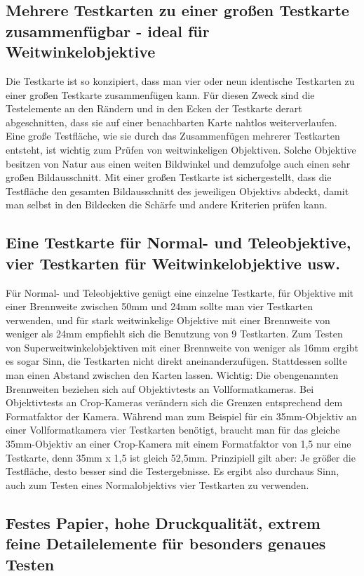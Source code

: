 \subsection{Mehrere Testkarten zu einer großen Testkarte zusammenfügbar - ideal für Weitwinkelobjektive}

Die Testkarte ist so konzipiert, dass man vier oder neun identische Testkarten zu einer großen Testkarte zusammenfügen kann. Für diesen Zweck sind die Testelemente an den Rändern und in den Ecken der Testkarte derart abgeschnitten, dass sie auf einer benachbarten Karte nahtlos weiterverlaufen. Eine große Testfläche, wie sie durch das Zusammenfügen mehrerer Testkarten entsteht, ist wichtig zum Prüfen von weitwinkeligen Objektiven. Solche Objektive besitzen von Natur aus einen weiten Bildwinkel und demzufolge auch einen sehr großen Bildausschnitt. Mit einer großen Testkarte ist sichergestellt, dass die Testfläche den gesamten Bildausschnitt des jeweiligen Objektivs abdeckt, damit man selbst in den Bildecken die Schärfe und andere Kriterien prüfen kann.

\subsection{Eine Testkarte für Normal- und Teleobjektive, vier Testkarten für Weitwinkelobjektive usw.}

Für Normal- und Teleobjektive genügt eine einzelne Testkarte, für Objektive mit einer Brennweite zwischen 50mm und 24mm sollte man vier Testkarten verwenden, und für stark weitwinkelige Objektive mit einer Brennweite von weniger als 24mm empfiehlt sich die Benutzung von 9 Testkarten. Zum Testen von Superweitwinkelobjektiven mit einer Brennweite von weniger als 16mm ergibt es sogar Sinn, die Testkarten nicht direkt aneinanderzufügen. Stattdessen sollte man einen Abstand zwischen den Karten lassen. Wichtig: Die obengenannten Brennweiten beziehen sich auf Objektivtests an Vollformatkameras. Bei Objektivtests an Crop-Kameras verändern sich die Grenzen entsprechend dem Formatfaktor der Kamera. Während man zum Beispiel für ein 35mm-Objektiv an einer Vollformatkamera vier Testkarten benötigt, braucht man für das gleiche 35mm-Objektiv an einer Crop-Kamera mit einem Formatfaktor von 1,5 nur eine Testkarte, denn 35mm x 1,5 ist gleich 52,5mm. Prinzipiell gilt aber: Je größer die Testfläche, desto besser sind die Testergebnisse. Es ergibt also durchaus Sinn, auch zum Testen eines Normalobjektivs vier Testkarten zu verwenden.

\subsection{Festes Papier, hohe Druckqualität, extrem feine Detailelemente für besonders genaues Testen}

